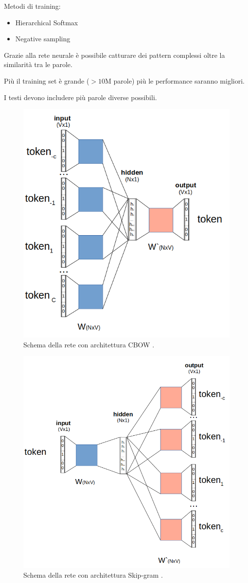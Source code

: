 Metodi di training:
\begin{itemize}
  \item Hierarchical Softmax
  \item Negative sampling
\end{itemize}

\pagebreak

Grazie alla rete neurale è possibile catturare dei pattern complessi oltre la similarità tra le parole.

Più il training set è grande ($>10\text{M}$ parole) più le performance saranno migliori.

I testi devono includere più parole diverse possibili.

\begin{figure}[ht]
  \centering
  \includegraphics[width=0.5\linewidth]{images/cbow.png}
  \caption{Schema della rete con architettura CBOW \cite{wiki:CBOW}.}
\end{figure}

\begin{figure}[ht]
  \centering
  \includegraphics[width=0.55\linewidth]{images/skipgram.png}
  \caption{Schema della rete con architettura Skip-gram \cite{wiki:Skipgram}.}
\end{figure}
